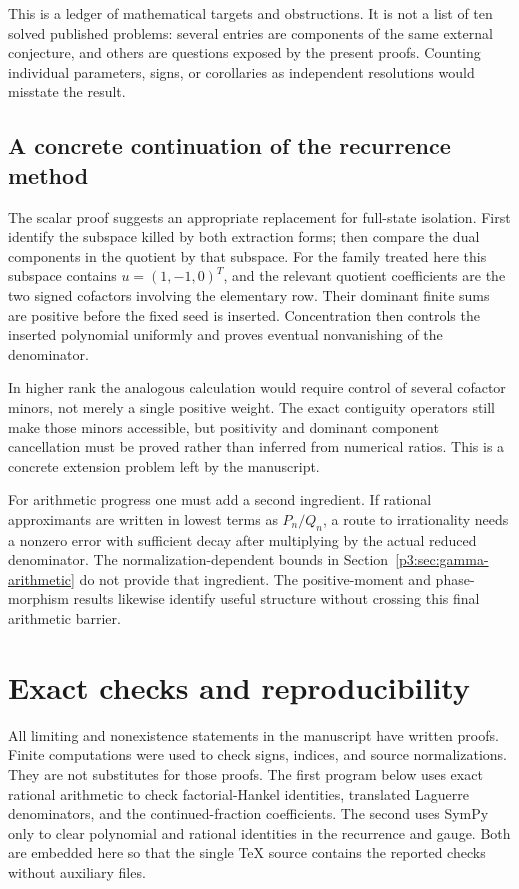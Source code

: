 \documentclass[11pt,a4paper]{article}
\theoremstyle{definition}
\theoremstyle{remark}
\numberwithin{equation}{section}
\renewcommand{\thesection}{\Roman{part}.\arabic{section}}
\renewcommand{\theHsection}{\arabic{part}.main.\arabic{section}}
\newcommand{\PartAppendix}{%
 \setcounter{section}{0}\setcounter{subsection}{0}%
 \renewcommand{\thesection}{\Roman{part}.\Alph{section}}%
 \renewcommand{\theHsection}{\arabic{part}.appendix.\arabic{section}}}
\begin{document}
This is a ledger of mathematical targets and obstructions. It is not a
list of ten solved published problems: several entries are components of
the same external conjecture, and others are questions exposed by the
present proofs. Counting individual parameters, signs, or corollaries as
independent resolutions would misstate the result.

\subsection{A concrete continuation of the recurrence method}

The scalar proof suggests an appropriate replacement for full-state
isolation. First identify the subspace killed by both extraction forms;
then compare the dual components in the quotient by that subspace. For
the family treated here this subspace contains $u=(1,-1,0)^T$, and the
relevant quotient coefficients are the two signed cofactors involving
the elementary row. Their dominant finite sums are positive before the
fixed seed is inserted. Concentration then controls the inserted
polynomial uniformly and proves eventual nonvanishing of the denominator.

In higher rank the analogous calculation would require control of several
cofactor minors, not merely a single positive weight. The exact contiguity
operators still make those minors accessible, but positivity and dominant
component cancellation must be proved rather than inferred from numerical
ratios. This is a concrete extension problem left by the manuscript.

For arithmetic progress one must add a second ingredient. If rational
approximants are written in lowest terms as $P_n/Q_n$, a route to
irrationality needs a nonzero error with sufficient decay after multiplying
by the actual reduced denominator. The normalization-dependent bounds in
Section~\ref{p3:sec:gamma-arithmetic} do not provide that ingredient. The
positive-moment and phase-morphism results likewise identify useful
structure without crossing this final arithmetic barrier.

\PartAppendix
\section{Exact checks and reproducibility}
\label{p3:sec:checks}

All limiting and nonexistence statements in the manuscript have written
proofs. Finite computations were used to check signs, indices, and source
normalizations. They are not substitutes for those proofs. The first
program below uses exact rational arithmetic to check factorial-Hankel
identities, translated Laguerre denominators, and the continued-fraction
coefficients. The second uses SymPy only to clear polynomial and rational
identities in the recurrence and gauge. Both are embedded here so that the
single TeX source contains the reported checks without auxiliary files.
\end{document}
